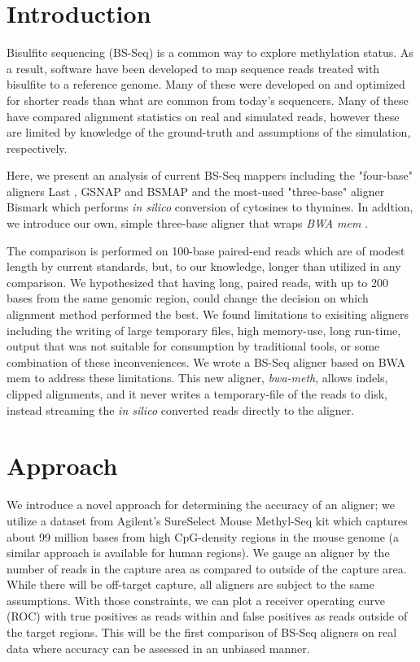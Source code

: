 \documentclass{bioinfo}
\begin{document}
\section{Introduction}
Bisulfite sequencing (BS-Seq) is a common way to explore methylation status.
As a result, software \citep{frithlast,methylcoder,gsnap,krueger2011,bsmap}
have been developed to map sequence reads treated with bisulfite to a reference genome.
Many of these were developed on and optimized for shorter reads
than what are common from today's sequencers. Many of these have compared alignment
statistics on real \citep{methylcoder,bsmap} and simulated \citep{frithlast} reads,
however these are limited by knowledge of the ground-truth and assumptions of
the simulation, respectively.

Here, we present an analysis of current BS-Seq mappers including the "four-base" aligners
Last \citep{frithlast}, GSNAP \citep{gsnap} and BSMAP \citep{bsmap} and the most-used
"three-base" aligner Bismark \citep{krueger2011} which performs \emph{in silico} conversion
of cytosines to thymines. In addtion, we introduce our
own, simple three-base aligner that wraps \textit{BWA mem} \citep{bwamem}.

The comparison is performed on 100-base paired-end reads
which are of modest length by current standards, but, to our knowledge, longer than
utilized in any comparison. We hypothesized that having long, paired reads, with up
to 200 bases from the same genomic region, could change the decision on which
alignment method performed the best. 
We found limitations to exisiting aligners including the writing of large temporary
files, high memory-use, long run-time, output that was not suitable for consumption by
traditional tools, or some combination of these inconveniences. We wrote
a BS-Seq aligner based on BWA mem \citep{bwamem} to address these
limitations. This new aligner, 
\textit{bwa-meth}, allows indels, clipped alignments, and it never writes a
temporary-file of the reads to disk, instead streaming the \emph{in silico} converted
reads directly to the aligner.

\section{Approach}
We introduce a novel approach for determining the accuracy of an aligner;
we utilize a dataset from Agilent's SureSelect Mouse Methyl-Seq kit which
captures about
99 million bases from high CpG-density regions in the mouse genome (a similar
approach is available for human regions).
We gauge an aligner by the number of reads in the capture area as compared
to outside of the capture area. While there will be off-target capture, all
aligners are subject to the same assumptions. With those constraints, we can
plot a receiver operating curve (ROC) with true positives as reads within
and false positives as reads outside of the target regions.
This will be the first comparison of BS-Seq aligners on real data where accuracy
can be assessed in an unbiased manner.
\end{document}
